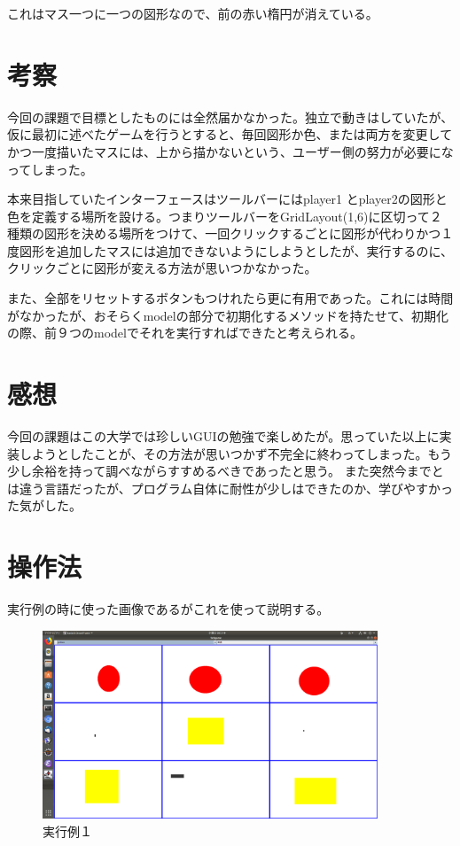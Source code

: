 \documentclass[12pt, a4paper, titlepage]{jsarticle}
\begin{document}
これはマス一つに一つの図形なので、前の赤い楕円が消えている。
\section{考察}
今回の課題で目標としたものには全然届かなかった。独立で動きはしていたが、仮に最初に述べたゲームを行うとすると、毎回図形か色、または両方を変更してかつ一度描いたマスには、上から描かないという、ユーザー側の努力が必要になってしまった。

本来目指していたインターフェースはツールバーにはplayer1 とplayer2の図形と色を定義する場所を設ける。つまりツールバーをGridLayout(1,6)に区切って２種類の図形を決める場所をつけて、一回クリックするごとに図形が代わりかつ１度図形を追加したマスには追加できないようにしようとしたが、実行するのに、クリックごとに図形が変える方法が思いつかなかった。

また、全部をリセットするボタンもつけれたら更に有用であった。これには時間がなかったが、おそらくmodelの部分で初期化するメソッドを持たせて、初期化の際、前９つのmodelでそれを実行すればできたと考えられる。
\section{感想}
今回の課題はこの大学では珍しいGUIの勉強で楽しめたが。思っていた以上に実装しようとしたことが、その方法が思いつかず不完全に終わってしまった。もう少し余裕を持って調べながらすすめるべきであったと思う。
また突然今までとは違う言語だったが、プログラム自体に耐性が少しはできたのか、学びやすかった気がした。
\section{操作法}
実行例の時に使った画像であるがこれを使って説明する。
\begin{figure}[htbp]
 \begin{center}
 \includegraphics[width=10cm,clip]{kekka1.png}
 \end{center}
 \caption{実行例１}
\end{figure}
\end{document}
